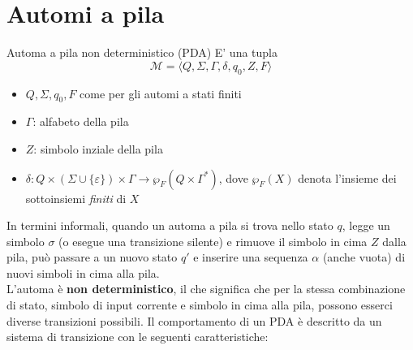 \documentclass[12pt, a4paper]{report}
\begin{document}
        \section{Automi a pila}
            \begin{definitionbox}{Automa a pila non deterministico (PDA)}{}
                E' una tupla \begin{equation*}
                    \mathcal{M}=\langle Q,\Sigma,\Gamma,\delta,q_0,Z,F\rangle
                \end{equation*}
                \begin{itemize}
                    \item $Q,\Sigma,q_0,F$ come per gli automi a stati finiti
                    \item $\Gamma$: alfabeto della pila
                    \item $Z$: simbolo inziale della pila
                    \item $\delta:Q\times(\Sigma\cup\{\varepsilon\})\times\Gamma\to\wp_F(Q\times\Gamma^*)$, dove $\wp_F(X)$ denota l'insieme dei sottoinsiemi \textit{finiti} di $X$
                \end{itemize}
            \end{definitionbox}
            In termini informali, quando un automa a pila si trova nello stato $q$, legge un simbolo $\sigma$ (o esegue una transizione silente) e rimuove il simbolo in cima $Z$ dalla pila, può passare a un nuovo stato $q'$ e inserire una sequenza $\alpha$ (anche vuota) di nuovi simboli in cima alla pila.\\
            L'automa è \textbf{non deterministico}, il che significa che per la stessa combinazione di stato, simbolo di input corrente e simbolo in cima alla pila, possono esserci diverse transizioni possibili.
            Il comportamento di un PDA è descritto da un sistema di transizione con le seguenti caratteristiche:
\end{document}
